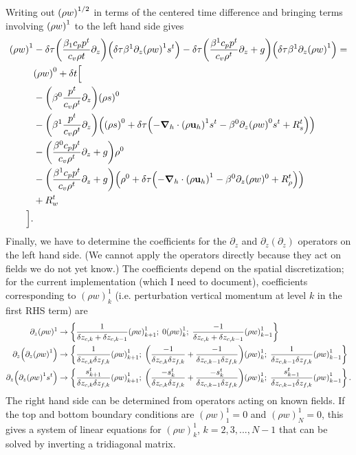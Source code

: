 \documentclass[11pt]{article}
\begin{document}
Writing out $\qty(\rho w)^{1/2}$ in terms of the centered time difference and bringing terms involving $\qty(\rho w)^1$ to the left hand side gives
\begin{align*}
\qty(\rho w)^1 &- \delta \tau \qty(\frac{\beta_1 c_p p^t}{c_v \rho t} \partial_z)\qty(\delta \tau \beta^1 \partial_z \qty(\rho w)^1 s^t) - \delta \tau \qty(\frac{\beta^1 c_p p^t}{c_v \rho^t} \partial_z + g) \qty(\delta \tau \beta^1 \partial_z \qty(\rho w)^1) = \\
& \qty(\rho w)^0 + \delta t \Big[ \\
& -\qty(\beta^0\frac{p^t}{c_v \rho^t} \partial_z) \qty(\rho s)^0 \\
& -\qty(\beta^1\frac{p^t}{c_v \rho^t} \partial_z) \qty(\qty(\rho s)^0 + \delta \tau \qty(-\grad_h \cdot \qty(\rho {\bf u}_h)^{1} s^t - \beta^0 \partial_z \qty(\rho w)^0 s^t + R_s^t)) \\ 
& - \qty(\frac{\beta^0 c_p p^t}{c_v \rho^t} \partial_z + g) \rho^0 \\
& - \qty(\frac{\beta^1 c_p p^t}{c_v \rho^t} \partial_z + g)\qty (\rho^0 + \delta \tau \qty(-\grad_h \cdot \qty(\rho {\bf u}_h)^{1} -\beta^0 \partial_z (\rho w)^0 + R_{\rho}^t)) \\
& + R_w^t \\
\Big ].
\end{align*}
Finally, we have to determine the coefficients for the $\partial_z$ and $\partial_z(\partial_z)$ operators on the left hand side. (We cannot apply the operators directly because they act on fields we do not yet know.) The coefficients depend on the spatial discretization; for the current implementation (which I need to document), coefficients corresponding to $(\rho w)^1_k$ (i.e. perturbation vertical momentum at level $k$ in the first RHS term) are
\begin{align*}
\partial_z(\rho w)^1 &\rightarrow \left \{ \frac{1}{\delta z_{c,k} + \delta z_{c,k-1}} \qty(\rho w)^1_{k+1};\; 0 \qty (\rho w)^1_k ;\; \frac{-1}{\delta z_{c,k} + \delta z_{c,k-1}} \qty(\rho w)^1_{k-1} \right \} \\
\partial_z\qty(\partial_z \qty(\rho w)^1 ) &\rightarrow \left \{ \frac{1}{\delta z_{c,k} \delta z_{f,k}} \qty(\rho w)^1_{k+1};\; \qty ( \frac{-1}{\delta z_{c,k} \delta z_{f,k}} + \frac{-1}{\delta z_{c,k-1} \delta z_{f,k}}) \qty(\rho w)^1_k;\; \frac{1}{\delta z_{c,k-1} \delta z_{f,k}} \qty(\rho w)^1_{k-1} \right \} \\
\partial_z\qty(\partial_z \qty(\rho w)^1 s^t ) &\rightarrow \left \{ \frac{s^t_{k+1}}{\delta z_{c,k} \delta z_{f,k}} \qty(\rho w)^1_{k+1};\; \qty ( \frac{-s^t_k}{\delta z_{c,k} \delta z_{f,k}} + \frac{-s^t_k}{\delta z_{c,k-1} \delta z_{f,k}}) \qty(\rho w)^1_k;\; \frac{s^t_{k-1}}{\delta z_{c,k-1} \delta z_{f,k}} \qty(\rho w)^1_{k-1} \right \}.
\end{align*}
The right hand side can be determined from operators acting on known fields. If the top and bottom boundary conditions are $(\rho w)^1_1 = 0$ and $(\rho w)^1_N = 0$, this gives a system of linear equations for $(\rho w)^1_k$, $k = 2, 3, ..., N-1$ that can be solved by inverting a tridiagonal matrix.
\end{document}
